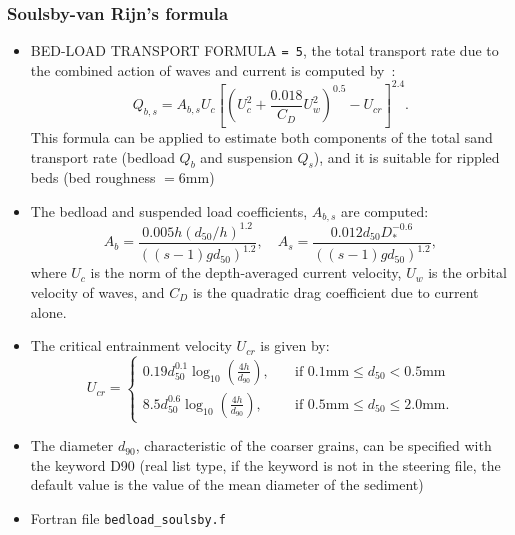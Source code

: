 \subsubsection{Soulsby-van Rijn's formula}
\begin{itemize}
\item {\ttfamily BED-LOAD TRANSPORT FORMULA} \texttt{= 5}, the total transport rate due to the combined action of waves and current is computed by~\cite{Soulsby97}:
\begin{equation*}
Q_{b,s} = A_{b,s} U_c\left[ \left( U_c^2+\frac{0.018}{C_D} U_w^2\right)^{0.5}-U_{cr}\right]^{2.4}. 
\end{equation*}
This formula can be applied to estimate both components of the total sand
transport rate (bedload $Q_b$ and suspension $Q_s$), and it is suitable for rippled beds (bed roughness $=6$mm)

\item The bedload and suspended load coefficients, $A_{b,s}$ are computed:
\begin{equation*}
A_b = \frac{0.005 h \left(d_{50}/h\right)^{1.2}}{\left((s-1)gd_{50}\right)^{1.2}}, \quad A_s = \frac{0.012 d_{50}D_*^{-0.6}}{\left((s-1)gd_{50}\right)^{1.2}},
\end{equation*}
where $U_c$ is the norm of the depth-averaged current velocity, $U_w$ is the orbital velocity of waves, and $C_D$ is the quadratic drag coefficient due to current alone.
\item The critical entrainment velocity $U_{cr}$ is given by:
\begin{equation*}
U_{cr} = \left\{\begin{array}{ll}
\displaystyle
0.19 d_{50}^{0.1}\log_{10}\left(\frac{4h}{d_{90}}\right), & \quad \text{if } 0.1 \text{mm}\leq d_{50} < 0.5 \text{mm} \\
\displaystyle
8.5 d_{50}^{0.6} \log_{10}\left(\frac{4h}{d_{90}} \right), & \quad \text{if } 0.5 \text{mm}\leq d_{50}\leq 2.0 \text{mm}.
\end{array}
\right.
\end{equation*}
\item The diameter $d_{90}$, characteristic of the coarser grains, can be specified with the keyword {\ttfamily D90} (real list type, if the keyword is not in the steering file, the default value
is the value of the mean diameter of the sediment) %
\item Fortran file \texttt{bedload\_soulsby.f}
\end{itemize}


